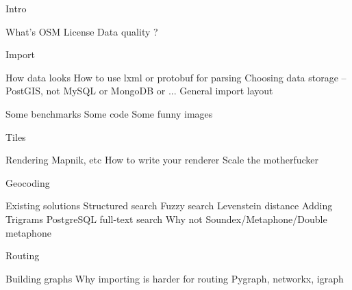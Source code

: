 \documentclass{beamer}
\begin{document}
Intro

What's OSM
License
Data quality ?

Import

How data looks
How to use lxml or protobuf for parsing
Choosing data storage -- PostGIS, not MySQL or MongoDB or ...
General import layout

Some benchmarks
Some code
Some funny images

Tiles

Rendering
Mapnik, etc
How to write your renderer
Scale the motherfucker

Geocoding

Existing solutions
Structured search
Fuzzy search
Levenstein distance
Adding
Trigrams
PostgreSQL full-text search
Why not Soundex/Metaphone/Double metaphone

Routing

Building graphs
Why importing is harder for routing
Pygraph, networkx, igraph
\end{document}
